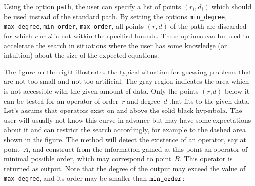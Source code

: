 \documentclass[11pt]{amsart}
\begin{document}
Using the option \verb|path|, the user can specify a list of points $(r_i,d_i)$
which should be used instead of the standard path. By setting the options \verb|min_degree|,
\verb|max_degree|, \verb|min_order|, \verb|max_order|, all points $(r,d)$ of the path
are discarded for which $r$ or $d$ is not within the specified bounds. These options
can be used to accelerate the search in situations where the user has some knowledge
(or intuition) about the size of the expected equations. 

\hangindent=-6.3cm\leavevmode
{}%
The figure on the right illustrates the typical situation for guessing problems
that are not too small and not too artificial. The gray region indicates
the area which is not accessible with the given amount of data. Only the points
$(r,d)$ below it can be tested for an operator of order~$r$ and degree~$d$ that
fits to the given data. Let's assume that operators exist on and above the solid
black hyperbola. The user will usually not know this curve in advance but may
have some expectations about it and can restrict the search accordingly, for
example to the dashed area shown in the figure. The method will detect the
existence of an operator, say at point~$A$, and construct from the information
gained at this point an operator of minimal possible order, which may correspond
to point~$B$.  This operator is returned as output. Note that the degree of the
output may exceed the value of \verb|max_degree|, and its order may be smaller
than $\verb|min_order|$:
\end{document}
